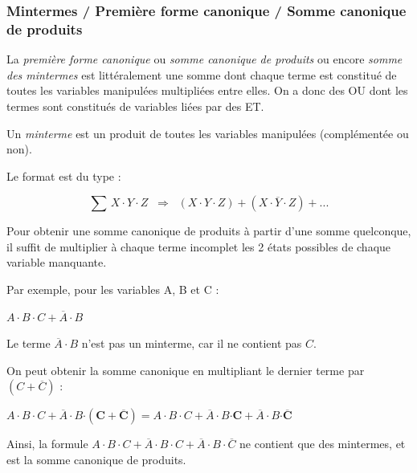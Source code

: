 \documentclass[11pt,a4paper]{article}
\begin{document}
\subsubsection{Mintermes / Première forme canonique / Somme canonique de produits}


\medskip

La \textit{première forme canonique} ou \textit{somme canonique de produits} ou encore \textit{somme des mintermes} est littéralement une somme dont chaque terme est constitué de toutes les variables manipulées multipliées entre elles.
On a donc des OU dont les termes sont constitués de variables liées par des ET.

\medskip

Un \textit{minterme} est un produit de toutes les variables manipulées (complémentée ou non).

\medskip

Le format est du type :

$$
\sum \, X \cdot Y \cdot Z   \; \; \Rightarrow \; \;  (X \cdot Y \cdot Z) + (X \cdot \overline{Y} \cdot Z) + ...
$$

Pour obtenir une somme canonique de produits à partir d'une somme quelconque, il suffit de multiplier à chaque terme incomplet les 2 états possibles de chaque variable manquante.

\medskip

Par exemple, pour les variables A, B et C :

\smallskip

$ A \cdot B \cdot C + \overline{A} \cdot B $

\smallskip

Le terme $ \overline{A} \cdot B $ n'est pas un minterme, car il ne contient pas $ C $.

On peut obtenir la somme canonique en multipliant le dernier terme par $ ( C + \overline{C} ) $ :

\smallskip

$ A \cdot B \cdot C + \overline{A} \cdot B \bm{\cdot ( C + \overline{C} )} = A \cdot B \cdot C + \overline{A} \cdot B \bm{\cdot C} + \overline{A} \cdot B \bm{\cdot \overline{C}} $

\bigskip

Ainsi, la formule $ A \cdot B \cdot C + \overline{A} \cdot B \cdot C + \overline{A} \cdot B \cdot \overline{C} $ ne contient que des mintermes, et est la somme canonique de produits.
\end{document}
